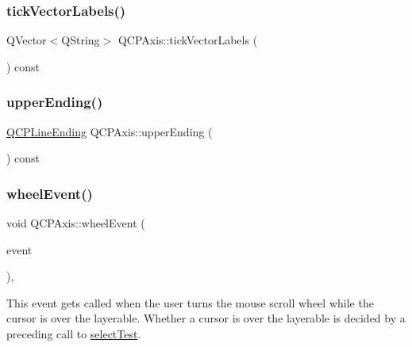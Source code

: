 \mbox{\label{class_q_c_p_axis_a1bd4a9036e0c9fc68b6f3df81f07e55f}} 
\subsubsection{\texorpdfstring{tickVectorLabels()}{tickVectorLabels()}}
{\footnotesize\ttfamily Q\+Vector$<$Q\+String$>$ Q\+C\+P\+Axis\+::tick\+Vector\+Labels (\begin{DoxyParamCaption}{ }\end{DoxyParamCaption}) const\hspace{0.3cm}{\ttfamily [inline]}}

\mbox{\label{class_q_c_p_axis_a9feaf5f78286693e89221bc205f9389a}} 
\subsubsection{\texorpdfstring{upperEnding()}{upperEnding()}}
{\footnotesize\ttfamily \mbox{\hyperlink{class_q_c_p_line_ending}{Q\+C\+P\+Line\+Ending}} Q\+C\+P\+Axis\+::upper\+Ending (\begin{DoxyParamCaption}{ }\end{DoxyParamCaption}) const}

\mbox{\label{class_q_c_p_axis_aa850f195d7cc470c53809d0fff5e444d}} 
\subsubsection{\texorpdfstring{wheelEvent()}{wheelEvent()}}
{\footnotesize\ttfamily void Q\+C\+P\+Axis\+::wheel\+Event (\begin{DoxyParamCaption}\item[{Q\+Wheel\+Event $\ast$}]{event }\end{DoxyParamCaption})\hspace{0.3cm}{\ttfamily [protected]}, {\ttfamily [virtual]}}

This event gets called when the user turns the mouse scroll wheel while the cursor is over the layerable. Whether a cursor is over the layerable is decided by a preceding call to \mbox{\hyperlink{class_q_c_p_axis_a63b7103c57fe9acfbce164334ea837f8}{select\+Test}}.

